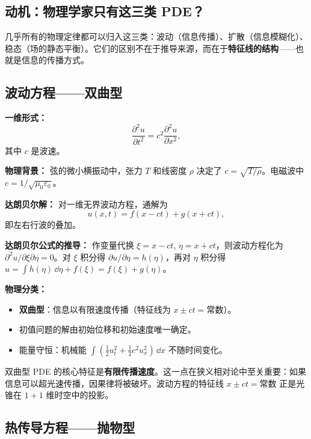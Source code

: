 \subsection*{动机：物理学家只有这三类 PDE？}

几乎所有的物理定律都可以归入这三类：波动（信息传播）、扩散（信息模糊化）、稳态（场的静态平衡）。它们的区别不在于推导来源，而在于\textbf{特征线的结构}——也就是信息的传播方式。

\subsection{波动方程——双曲型}

\textbf{一维形式：}
\begin{equation}
\frac{\partial^2 u}{\partial t^2} = c^2 \frac{\partial^2 u}{\partial x^2},
\label{eq:wave1d}
\end{equation}
其中 $c$ 是波速。

\textbf{物理背景：} 弦的微小横振动中，张力 $T$ 和线密度 $\rho$ 决定了 $c = \sqrt{T/\rho}$。电磁波中 $c = 1/\sqrt{\mu_0\varepsilon_0}$。

\textbf{达朗贝尔解：} 对一维无界波动方程，通解为
\begin{equation}
u(x,t) = f(x-ct) + g(x+ct),
\end{equation}
即左右行波的叠加。

\textbf{达朗贝尔公式的推导：} 作变量代换 $\xi = x - ct$, $\eta = x + ct$，则波动方程化为 $\partial^2 u/\partial\xi\partial\eta = 0$。对 $\xi$ 积分得 $\partial u/\partial\eta = h(\eta)$，再对 $\eta$ 积分得 $u = \int h(\eta)\,\dd\eta + f(\xi) = f(\xi) + g(\eta)$。

\textbf{物理分类：}
\begin{itemize}
\item \textbf{双曲型}：信息以有限速度传播（特征线为 $x\pm ct = \text{常数}$）。
\item 初值问题的解由初始位移和初始速度唯一确定。
\item 能量守恒：机械能 $\int (\frac12 u_t^2 + \frac12 c^2 u_x^2)\,\dd x$ 不随时间变化。
\end{itemize}

\begin{insight}[双曲型方程的物理直觉]
双曲型 PDE 的核心特征是\textbf{有限传播速度}。这一点在狭义相对论中至关重要：如果信息可以超光速传播，因果律将被破坏。波动方程的特征线 $x \pm ct = \text{常数}$ 正是光锥在 $1+1$ 维时空中的投影。
\end{insight}

\subsection{热传导方程——抛物型}

